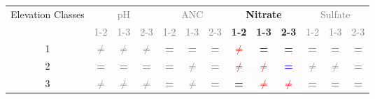 \begin{table}\scriptsize
\begin{center}
\begin{tabular}{ccccccccccccc}
\toprule
\multicolumn{1}{p{1cm}}{Elevation Classes}& \multicolumn{ 3}{c}{\textcolor{gray}{pH}}                                                                & \multicolumn{ 3}{c}{\textcolor{gray}{ANC}}                                         & \multicolumn{ 3}{c}{\textbf{Nitrate}}                                         & \multicolumn{ 3}{c}{\textcolor{gray}{Sulfate}}                                 \\ \cline{2-13}\noalign{\smallskip}
                                                                       & \multicolumn{ 1}{c}{\textcolor{gray}{1-2}} & \textcolor{gray}{1-3}                       & \textcolor{gray}{2-3}                      & \textcolor{gray}{1-2}             & \textcolor{gray}{1-3}                        & \textcolor{gray}{2-3}                      & \textbf{1-2}                     & \textbf{1-3}                      & \textbf{2-3}                     & \textcolor{gray}{1-2}                       & \textcolor{gray}{1-3}                     & \textcolor{gray}{2-3}             \\  \cline{2-13}
\multicolumn{1}{c}{1}                                    & \textcolor{gray}{\textbf{$\neq$}}               & \textcolor{gray}{\textbf{$\neq$}}  & \textcolor{gray}{\textbf{$\neq$}} & \textcolor{gray}{\textbf{=}} & \textcolor{gray}{\textbf{=}}            & \textcolor{gray}{\textbf{=}}          & \textcolor{red}{\textbf{$\neq$}} & \textcolor{blue}{\textbf{=}}          & \textcolor{blue}{\textbf{=}}           & \textcolor{gray}{\textbf{=}}          & \textcolor{gray}{\textbf{=}}         & \textcolor{gray}{\textbf{=}} \\ 
\multicolumn{1}{c}{2}                                    & \textcolor{gray}{\textbf{=}}                        & \textcolor{gray}{\textbf{=}}          & \textcolor{gray}{\textbf{=}}          & \textcolor{gray}{\textbf{=}} & \textcolor{gray}{\textbf{$\neq$}}    & \textcolor{gray}{\textbf{=}}          & \textcolor{red}{\textbf{$\neq$}} & \textcolor{red}{\textbf{$\neq$}} & \textcolor{blue}{\textbf{=}}           & \textcolor{gray}{\textbf{$\neq$}} & \textcolor{gray}{\textbf{$\neq$}} & \textcolor{gray}{\textbf{=}} \\ 
\multicolumn{1}{c}{3}                                    &\textcolor{gray}{\textbf{$\neq$}}               & \textcolor{gray}{\textbf{$\neq$}}  & \textcolor{gray}{\textbf{$\neq$}} & \textcolor{gray}{\textbf{=}} & \textcolor{gray}{\textbf{$\neq$}}    & \textcolor{gray}{\textbf{=}}          & \textcolor{blue}{\textbf{=}}          & \textcolor{red}{\textbf{$\neq$}} & \textcolor{red}{\textbf{$\neq$}} & \textcolor{gray}{\textbf{=}}          & \textcolor{gray}{\textbf{=}}         & \textcolor{gray}{\textbf{=}} \\ 

\end{tabular}
\end{center}
\end{table}
